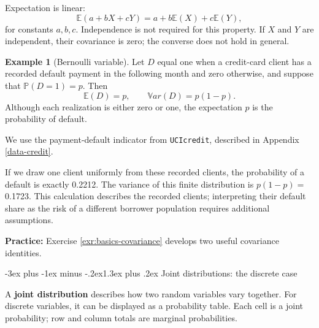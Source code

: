 \documentclass[
  11pt,
]{book}
\makeatletter
\renewcommand\section{\@startsection{section}{1}{\z@}
  {-3ex plus -1ex minus -.2ex}{1.3ex plus .2ex}
  {\normalfont\Large\bfseries\color{TextbookInk}}}
\theoremstyle{definition}
\theoremstyle{definition}
\newtheorem{example}{Example}[chapter]
\theoremstyle{definition}
\theoremstyle{definition}
\theoremstyle{remark}
\makeatother
\begin{document}
Expectation is linear:
\[
\mathbb{E}(a+bX+cY)=a+b\mathbb{E}(X)+c\mathbb{E}(Y),
\]
for constants \(a,b,c\). Independence is not required for this property. If \(X\) and \(Y\) are independent, their covariance is zero; the converse does not hold in general.

\begin{example}[Bernoulli variable]
\protect\hypertarget{exm:bernoulli-moments}{}\label{exm:bernoulli-moments}Let \(D\) equal one when a credit-card client has a recorded default payment in the following month and zero otherwise, and suppose that \(\mathbb{P}(D=1)=p\). Then
\[
\mathbb{E}(D)=p,\qquad \mathbb{V}ar(D)=p(1-p).
\]
Although each realization is either zero or one, the expectation \(p\) is the probability of default.

We use the payment-default indicator from \texttt{UCIcredit}, described in Appendix \ref{data-credit}.

\begin{table}[H]
\centering\begingroup\fontsize{10}{12}\selectfont

\endgroup{}
\end{table}

If we draw one client uniformly from these recorded clients, the probability of a default is exactly 0.2212. The variance of this finite distribution is \(p(1-p)=\) 0.1723. This calculation describes the recorded clients; interpreting their default share as the risk of a different borrower population requires additional assumptions.
\end{example}

\begin{practicebox}
\textbf{Practice:} Exercise \ref{exr:basics-covariance} develops two useful covariance identities.

\end{practicebox}

\section{Joint distributions: the discrete case}\label{basics-discrete}

A \textbf{joint distribution} describes how two random variables vary together. For discrete variables, it can be displayed as a probability table. Each cell is a joint probability; row and column totals are marginal probabilities.
\end{document}
